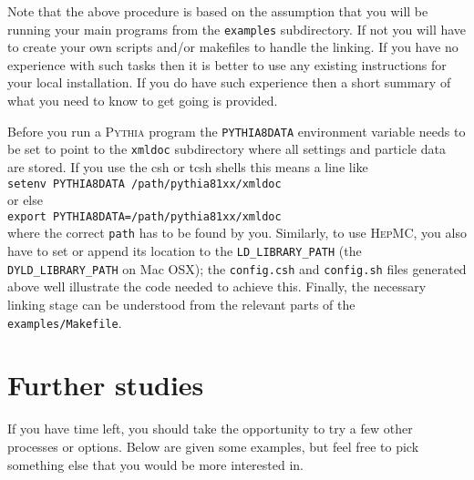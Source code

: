\documentclass[12pt,a4paper]{article}
\begin{document}
Note that the above procedure is based on the assumption that you will
be running your main programs from the \texttt{examples} subdirectory.
If not you will have to create your own scripts and/or makefiles to handle
the linking. If you have no experience with such tasks then it is better
to use any existing instructions for your local installation. If you do
have such experience then a short summary of what you need to know
to get going is provided.

Before you run a \textsc{Pythia} program the \texttt{PYTHIA8DATA} 
environment variable needs to be set to point to the \texttt{xmldoc} 
subdirectory where all settings and particle data are stored. If you 
use the csh or tcsh shells this means a line like\\
\hspace*{10mm}\texttt{setenv PYTHIA8DATA /path/pythia81xx/xmldoc}\\
or else\\   
\hspace*{10mm}\texttt{export PYTHIA8DATA=/path/pythia81xx/xmldoc}\\
where the correct \texttt{path} has to be found by you. 
Similarly, to use \textsc{HepMC}, you also have to set or append its
location to the \texttt{LD\_LIBRARY\_PATH} (the 
\texttt{DYLD\_LIBRARY\_PATH} on Mac OSX); the \texttt{config.csh} 
and \texttt{config.sh} files generated above well illustrate the code
needed to achieve this. Finally, the necessary linking stage can
be understood from the relevant parts of the \texttt{examples/Makefile}. 

\section{Further studies}

If you have time left, you should take the opportunity to try 
a few other processes or options. Below are given some examples, 
but feel free to pick something else that you would be more
interested in.  
\end{document}
